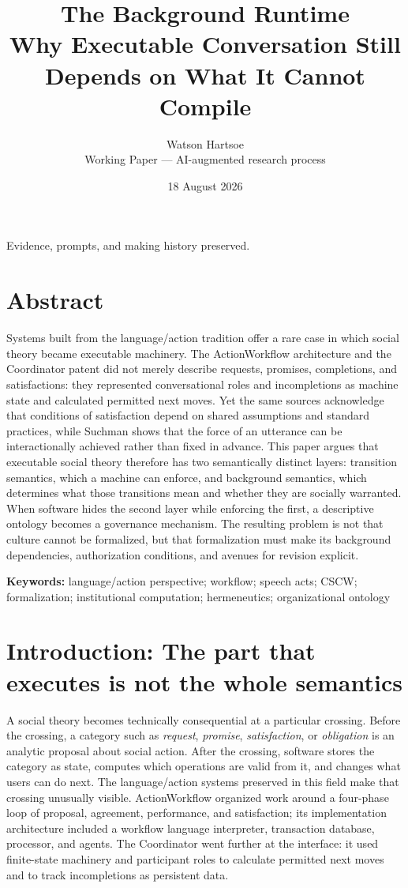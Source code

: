 \documentclass[11pt]{article}
\title{\textbf{The Background Runtime}\\\large Why Executable Conversation Still Depends on What It Cannot Compile}
\author{Watson Hartsoe\\\small Working Paper --- AI-augmented research process}
\date{18 August 2026}
\begin{document}
\maketitle


\noindent Evidence, prompts, and making history preserved.\par

\section*{Abstract}

Systems built from the language/action tradition offer a rare case in which social theory became executable machinery. The ActionWorkflow architecture and the Coordinator patent did not merely describe requests, promises, completions, and satisfactions: they represented conversational roles and incompletions as machine state and calculated permitted next moves. Yet the same sources acknowledge that conditions of satisfaction depend on shared assumptions and standard practices, while Suchman shows that the force of an utterance can be interactionally achieved rather than fixed in advance. This paper argues that executable social theory therefore has two semantically distinct layers: transition semantics, which a machine can enforce, and background semantics, which determines what those transitions mean and whether they are socially warranted. When software hides the second layer while enforcing the first, a descriptive ontology becomes a governance mechanism. The resulting problem is not that culture cannot be formalized, but that formalization must make its background dependencies, authorization conditions, and avenues for revision explicit.\par

\textbf{Keywords:} language/action perspective; workflow; speech acts; CSCW; formalization; institutional computation; hermeneutics; organizational ontology\par

\section{Introduction: The part that executes is not the whole semantics}

A social theory becomes technically consequential at a particular crossing. Before the crossing, a category such as \emph{request}, \emph{promise}, \emph{satisfaction}, or \emph{obligation} is an analytic proposal about social action. After the crossing, software stores the category as state, computes which operations are valid from it, and changes what users can do next. The language/action systems preserved in this field make that crossing unusually visible. ActionWorkflow organized work around a four-phase loop of proposal, agreement, performance, and satisfaction; its implementation architecture included a workflow language interpreter, transaction database, processor, and agents. The Coordinator went further at the interface: it used finite-state machinery and participant roles to calculate permitted next moves and to track incompletions as persistent data. \cite{medinamora1992actionworkflow,flores1993conversation}\par
\end{document}
